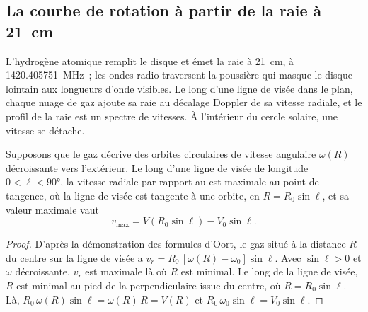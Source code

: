 \subsection*{La courbe de rotation à partir de la raie à 21~cm}

L'hydrogène atomique remplit le disque et émet la raie à 21~cm, à
\qty{1420.405751}{MHz}~; les ondes radio traversent la poussière qui masque le
disque lointain aux longueurs d'onde visibles. Le long d'une ligne de visée
dans le plan, chaque nuage de gaz ajoute sa raie au décalage Doppler de
sa vitesse radiale, et le profil de la raie est un spectre de
vitesses. À l'intérieur du cercle solaire, une vitesse se détache.

\begin{theorem}\label{thm:b3:milky-way-galaxies:tangent}
Supposons que le gaz décrive des orbites circulaires de vitesse angulaire $\omega(R)$
décroissante vers l'extérieur. Le long d'une ligne de visée de longitude
$0 < \ell < \ang{90}$, la vitesse radiale par rapport au  est maximale
au point de tangence, où la ligne de visée est tangente à une orbite, en
$R = R_0\sin\ell$, et sa valeur maximale vaut
\[
v_\mathrm{max} = V(R_0\sin\ell) - V_0\sin\ell .
\]
\end{theorem}

\begin{proof}
D'après la démonstration des formules d'Oort, le gaz situé à la distance $R$ du centre sur
la ligne de visée a $v_r = R_0\,[\omega(R) - \omega_0]\sin\ell$. Avec
$\sin\ell > 0$ et $\omega$ décroissante, $v_r$ est maximale là où $R$ est
minimal. Le long de la ligne de visée, $R$ est minimal au pied de la
perpendiculaire issue du centre, où $R = R_0\sin\ell$. Là,
$R_0\,\omega(R)\sin\ell = \omega(R)\,R = V(R)$ et
$R_0\,\omega_0\sin\ell = V_0\sin\ell$.
\end{proof}

